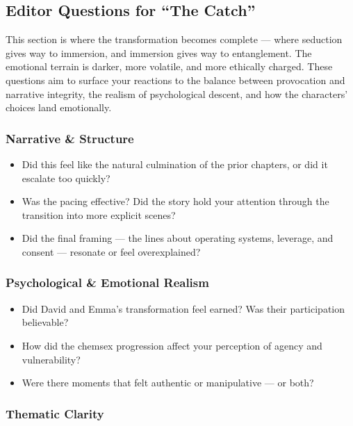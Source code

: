 \medskip

\subsection{Editor Questions for ``The Catch''}

This section is where the transformation becomes complete — where seduction gives way to immersion, and immersion gives way to entanglement. The emotional terrain is darker, more volatile, and more ethically charged. These questions aim to surface your reactions to the balance between provocation and narrative integrity, the realism of psychological descent, and how the characters’ choices land emotionally.

\subsubsection{Narrative \& Structure}

\begin{itemize}
  \item Did this feel like the natural culmination of the prior chapters, or did it escalate too quickly?
  \item Was the pacing effective? Did the story hold your attention through the transition into more explicit scenes?
  \item Did the final framing — the lines about operating systems, leverage, and consent — resonate or feel overexplained?
\end{itemize}

\subsubsection{Psychological \& Emotional Realism}

\begin{itemize}
  \item Did David and Emma’s transformation feel earned? Was their participation believable?
  \item How did the chemsex progression affect your perception of agency and vulnerability?
  \item Were there moments that felt authentic or manipulative — or both?
\end{itemize}

\subsubsection{Thematic Clarity}

